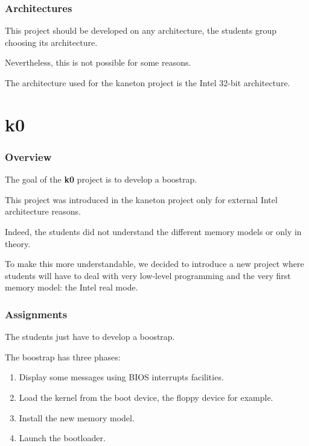 
\begin{frame}
  \frametitle{Architectures}

  This project should be developed on any architecture, the students group
  choosing its architecture.

  \nl

  Nevertheless, this is not possible for some reasons.

  \nl

  The architecture used for the kaneton project is the Intel 32-bit
  architecture.
\end{frame}

%
%

\section{k0}


\begin{frame}
  \frametitle{Overview}

  The goal of the \textbf{k0} project is to develop a boostrap.

  \nl

  This project was introduced in the kaneton project only for
  external Intel architecture reasons.

  \nl

  Indeed, the students did not understand the different memory models
  or only in theory.

  \nl

  To make this more understandable, we decided to introduce a new project
  where students will have to deal with very low-level programming and the
  very first memory model: the Intel real mode.
\end{frame}


\begin{frame}
  \frametitle{Assignments}

  The students just have to develop a boostrap.

  \nl

  The boostrap has three phases:

  \begin{enumerate}[<+->]
    \item
      Display some messages using BIOS interrupts facilities.
    \item
      Load the kernel from the boot device, the floppy device for example.
    \item
      Install the new memory model.
    \item
      Launch the bootloader.
  \end{enumerate}
\end{frame}

